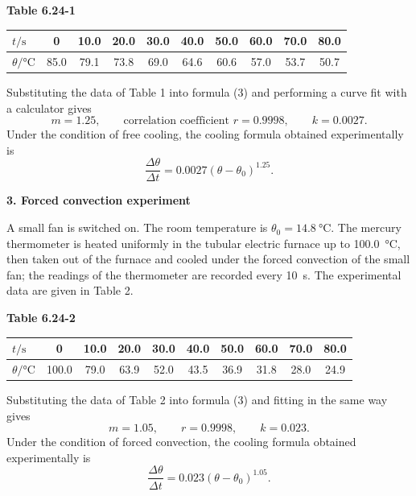 \begin{center}
\textbf{Table 6.24-1}\\[3pt]
\begin{tabular}{lccccccccc}
\toprule
$t/\mathrm{s}$ & 0 & 10.0 & 20.0 & 30.0 & 40.0 & 50.0 & 60.0 & 70.0 & 80.0\\
\midrule
$\theta/\si{\celsius}$ & 85.0 & 79.1 & 73.8 & 69.0 & 64.6 & 60.6 & 57.0 & 53.7 & 50.7\\
\bottomrule
\end{tabular}
\end{center}

Substituting the data of Table 1 into formula (3) and performing a curve fit with a calculator gives
\begin{equation*}
m=1.25,\qquad \text{correlation coefficient } r=0.9998,\qquad k=0.0027 .
\end{equation*}
Under the condition of free cooling, the cooling formula obtained experimentally is
\begin{equation*}
\frac{\Delta\theta}{\Delta t}=0.0027(\theta-\theta_0)^{1.25}.
\end{equation*}

\textbf{3. Forced convection experiment}

A small fan is switched on. The room temperature is $\theta_0=\SI{14.8}{\celsius}$. The mercury thermometer is heated uniformly in the tubular electric furnace up to \SI{100.0}{\celsius}, then taken out of the furnace and cooled under the forced convection of the small fan; the readings of the thermometer are recorded every \SI{10}{s}. The experimental data are given in Table 2.

\begin{center}
\textbf{Table 6.24-2}\\[3pt]
\begin{tabular}{lccccccccc}
\toprule
$t/\mathrm{s}$ & 0 & 10.0 & 20.0 & 30.0 & 40.0 & 50.0 & 60.0 & 70.0 & 80.0\\
\midrule
$\theta/\si{\celsius}$ & 100.0 & 79.0 & 63.9 & 52.0 & 43.5 & 36.9 & 31.8 & 28.0 & 24.9\\
\bottomrule
\end{tabular}
\end{center}

\noindent Substituting the data of Table 2 into formula (3) and fitting in the same way gives
\begin{equation*}
m=1.05,\qquad r=0.9998,\qquad k=0.023 .
\end{equation*}
Under the condition of forced convection, the cooling formula obtained experimentally is
\begin{equation*}
\frac{\Delta\theta}{\Delta t}=0.023(\theta-\theta_0)^{1.05}.
\end{equation*}

